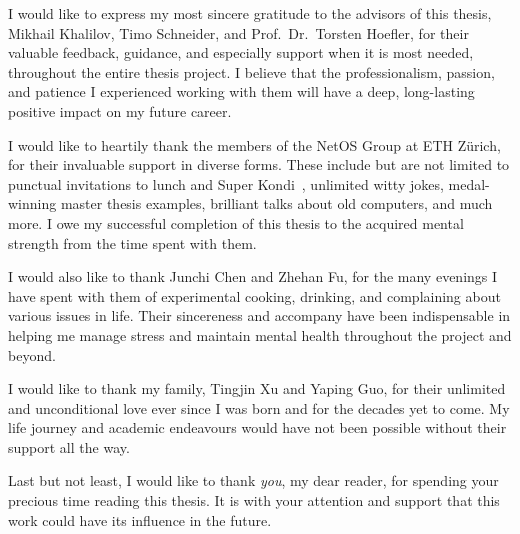 I would like to express my most sincere gratitude to the advisors of this thesis, Mikhail Khalilov, Timo Schneider, and Prof.\ Dr.\ Torsten Hoefler, for their valuable feedback, guidance, and especially support when it is most needed, throughout the entire thesis project.  I believe that the professionalism, passion, and patience I experienced working with them will have a deep, long-lasting positive impact on my future career.

I would like to heartily thank the members of the NetOS Group at ETH Z\"urich, for their invaluable support in diverse forms.  These include but are not limited to punctual invitations to lunch and Super Kondi~\cite{noauthor_kondi_nodate}, unlimited witty jokes, medal-winning master thesis examples, brilliant talks about old computers, and much more.  I owe my successful completion of this thesis to the acquired mental strength from the time spent with them.

I would also like to thank Junchi Chen and Zhehan Fu, for the many evenings I have spent with them of experimental cooking, drinking, and complaining about various issues in life.  Their sincereness and accompany have been indispensable in helping me manage stress and maintain mental health throughout the project and beyond.

I would like to thank my family, Tingjin Xu and Yaping Guo, for their unlimited and unconditional love ever since I was born and for the decades yet to come.  My life journey and academic endeavours would have not been possible without their support all the way.

Last but not least, I would like to thank \emph{you}, my dear reader, for spending your precious time reading this thesis.  It is with your attention and support that this work could have its influence in the future.
